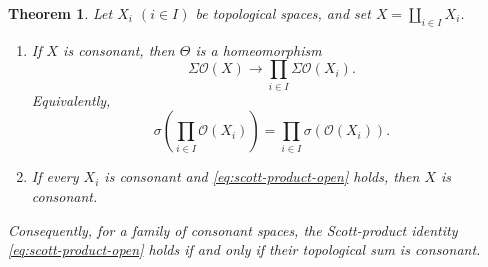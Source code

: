 \documentclass[11pt,reqno]{amsart}
\newtheorem{theorem}{Theorem}[section]
\theoremstyle{definition}
\numberwithin{equation}{section}
\newcommand{\OO}{\mathcal O}
\begin{document}
\begin{theorem}\label{thm:consonance-characterization}
Let $X_i$ $(i\in I)$ be topological spaces, and set
$X=\coprod_{i\in I}X_i$.
\begin{enumerate}
\item If $X$ is consonant, then $\Theta$ is a homeomorphism
\[
   \Sigma\OO(X)\longrightarrow\prod_{i\in I}\Sigma\OO(X_i).
\]
Equivalently,
\begin{equation}\label{eq:scott-product-open}
  \sigma\!\left(\prod_{i\in I}\OO(X_i)\right)
  =\prod_{i\in I}\sigma(\OO(X_i)).
\end{equation}
\item If every $X_i$ is consonant and \eqref{eq:scott-product-open} holds,
then $X$ is consonant.
\end{enumerate}
Consequently, for a family of consonant spaces, the Scott-product identity
\eqref{eq:scott-product-open} holds if and only if their topological sum is
consonant.
\end{theorem}
\end{document}

